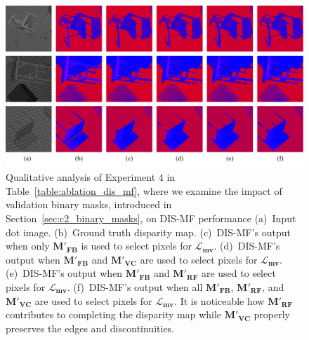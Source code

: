 \begin{figure}[t]
    \begin{center}
        \includegraphics[width=1.0\linewidth]{images/chapter2/supp_figures/ablation_mf_masks.jpg}
    \end{center}
   \caption{Qualitative analysis of Experiment 4 in Table~\ref{table:ablation_dis_mf}, where we examine the impact of validation binary masks, introduced in Section~\ref{sec:c2_binary_masks}, on DIS-MF performance (a)~Input dot image. (b)~Ground truth disparity map. (c)~DIS-MF's output when only $\boldsymbol{M'_{FB}}$ is used to select pixels for $\boldsymbol{\mathcal{L}_{mv}}$. (d)~DIS-MF's output when $\boldsymbol{M'_{FB}}$ and $\boldsymbol{M'_{VC}}$ are used to select pixels for $\boldsymbol{\mathcal{L}_{mv}}$. (e)~DIS-MF's output when $\boldsymbol{M'_{FB}}$ and $\boldsymbol{M'_{RF}}$ are used to select pixels for $\boldsymbol{\mathcal{L}_{mv}}$. (f)~DIS-MF's output when all $\boldsymbol{M'_{FB}}$, $\boldsymbol{M'_{RF}}$, and $\boldsymbol{M'_{VC}}$ are used to select pixels for $\boldsymbol{\mathcal{L}_{mv}}$. It is noticeable how $\boldsymbol{M'_{RF}}$ contributes to completing the disparity map while $\boldsymbol{M'_{VC}}$ properly preserves the edges and discontinuities.}
    \label{fig:c2_ablation_mf_masks}
\end{figure}

